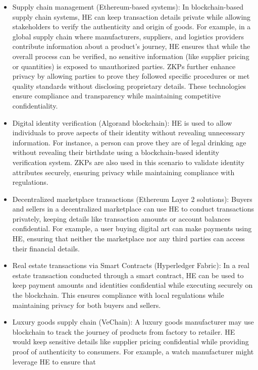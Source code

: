 \documentclass[
  letterpaper,
  DIV=11,
  numbers=noendperiod,
  oneside]{scrartcl}
\begin{document}
\begin{itemize}
\item
  Supply chain management (Ethereum-based systems): In blockchain-based
  supply chain systems, HE can keep transaction details private while
  allowing stakeholders to verify the authenticity and origin of goods.
  For example, in a global supply chain where manufacturers, suppliers,
  and logistics providers contribute information about a product's
  journey, HE ensures that while the overall process can be verified, no
  sensitive information (like supplier pricing or quantities) is exposed
  to unauthorized parties. ZKPs further enhance privacy by allowing
  parties to prove they followed specific procedures or met quality
  standards without disclosing proprietary details. These technologies
  ensure compliance and transparency while maintaining competitive
  confidentiality.
\item
  Digital identity verification (Algorand blockchain): HE is used to
  allow individuals to prove aspects of their identity without revealing
  unnecessary information. For instance, a person can prove they are of
  legal drinking age without revealing their birthdate using a
  blockchain-based identity verification system. ZKPs are also used in
  this scenario to validate identity attributes securely, ensuring
  privacy while maintaining compliance with regulations.
\item
  Decentralized marketplace transactions (Ethereum Layer 2 solutions):
  Buyers and sellers in a decentralized marketplace can use HE to
  conduct transactions privately, keeping details like transaction
  amounts or account balances confidential. For example, a user buying
  digital art can make payments using HE, ensuring that neither the
  marketplace nor any third parties can access their financial details.
\item
  Real estate transactions via Smart Contracts (Hyperledger Fabric): In
  a real estate transaction conducted through a smart contract, HE can
  be used to keep payment amounts and identities confidential while
  executing securely on the blockchain. This ensures compliance with
  local regulations while maintaining privacy for both buyers and
  sellers.
\item
  Luxury goods supply chain (VeChain): A luxury goods manufacturer may
  use blockchain to track the journey of products from factory to
  retailer. HE would keep sensitive details like supplier pricing
  confidential while providing proof of authenticity to consumers. For
  example, a watch manufacturer might leverage HE to ensure that

\end{itemize}
\end{document}
